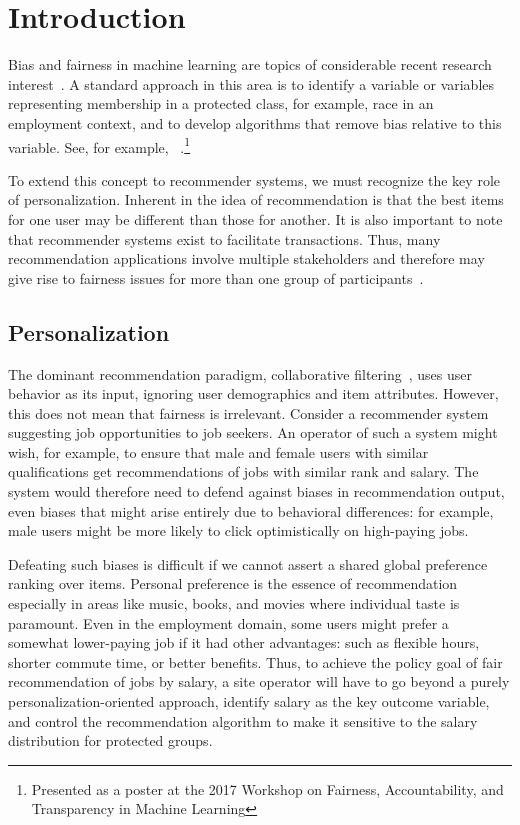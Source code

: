 
\section{Introduction}

\noindent Bias and fairness in machine learning are topics of considerable recent research interest~\cite{pedreshi2008discrimination,fairness,bozdag_bias_2013}. A standard approach in this area is to identify a variable or variables representing membership in a protected class, for example, race in an employment context, and to develop algorithms that remove bias relative to this variable. See, for example, ~\cite{zemel2013learning,Kamishima2012,kamiran2010discrimination,zhang2017anti}.{\let\thefootnote\relax\footnote{Presented as a poster at the 2017 Workshop on Fairness, Accountability, and Transparency in Machine Learning}}

To extend this concept to recommender systems, we must recognize the key role of personalization. Inherent in the idea of recommendation is that the best items for one user may be different than those for another. It is also important to note that recommender systems exist to facilitate transactions. Thus, many recommendation applications involve multiple stakeholders and therefore may give rise to fairness issues for more than one group of participants~\cite{abdollahpouri_recommender_2017}.

\subsection{Personalization}

The dominant recommendation paradigm, collaborative filtering~\cite{koren2011advances}, uses user behavior as its input, ignoring user demographics and item attributes. However, this does not mean that fairness is irrelevant. Consider a recommender system suggesting job opportunities to job seekers. An operator of such a system might wish, for example, to ensure that male and female users with similar qualifications get recommendations of jobs with similar rank and salary. The system would therefore need to defend against biases in recommendation output, even biases that might arise entirely due to behavioral differences: for example, male users might be more likely to click optimistically on high-paying jobs. 

Defeating such biases is difficult if we cannot assert a shared global preference ranking over items. Personal preference is the essence of recommendation especially in areas like music, books, and movies where individual taste is paramount. Even in the employment domain, some users might prefer a somewhat lower-paying job if it had other advantages: such as flexible hours, shorter commute time, or better benefits. Thus, to achieve the policy goal of fair recommendation of jobs by salary, a site operator will have to go beyond a purely personalization-oriented approach, identify salary as the key outcome variable, and control the recommendation algorithm to make it sensitive to the salary distribution for protected groups.

